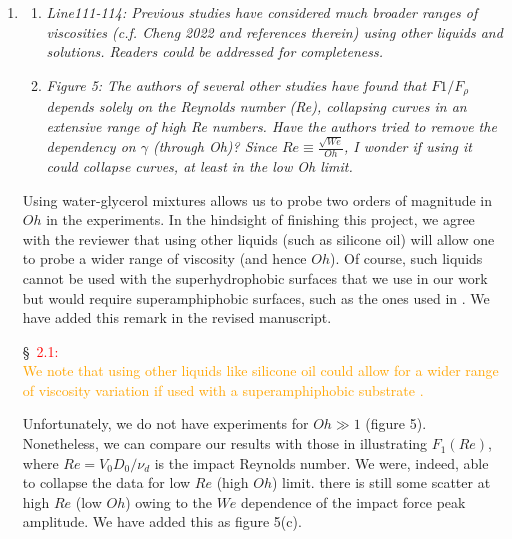\documentclass[]{article}
\newcommand*\red{\textcolor{red}}
\newcommand{\VS}[1]{{\textcolor{orange}{#1}}}
\begin{document}
\begin{enumerate}
	 \item 
	 \begin{enumerate}
	 	 \item \textit{Line111-114: Previous studies have considered much broader ranges of viscosities (c.f. Cheng 2022 and references therein) using other liquids and solutions. Readers could be addressed for completeness.}
	 	\item \textit{Figure 5: The authors of several other studies have found that $F1/F_\rho$ depends solely on the Reynolds number (Re), collapsing curves in an extensive range of high Re numbers. Have the authors tried to remove the dependency on $\gamma$ (through Oh)? Since $Re \equiv \frac{\sqrt{We}}{Oh}$, I wonder if using it could collapse curves, at least in the low Oh limit.}	 	
	 \end{enumerate}
	 	
	Using water-glycerol mixtures allows us to probe two orders of magnitude in $Oh$ in the experiments. In the hindsight of finishing this project, we agree with the reviewer that using other liquids (such as silicone oil) will allow one to probe a wider range of viscosity  (and hence $Oh$). Of course, such liquids cannot be used with the superhydrophobic surfaces that we use in our work but would require superamphiphobic surfaces, such as the ones used in \citet{deng2012candle, ramirez2020lifting}. We have added this remark in the revised manuscript. 
	
	\S~\red{2.1:}\\
	\VS{We note that using other liquids like silicone oil could allow for a wider range of viscosity variation if used with a superamphiphobic substrate \citep{deng2012candle}.}
	
	Unfortunately, we do not have experiments for $Oh \gg 1$ (figure 5). Nonetheless, we can compare our results with those in \citet{Gordillo2018, cheng2021drop} illustrating $F_1(Re)$, where $Re = V_0D_0/\nu_d$ is the impact Reynolds number. We were, indeed, able to collapse the data for low $Re$ (high $Oh$) limit. there is still some scatter at high $Re$ (low $Oh$) owing to the $We$ dependence of the impact force peak amplitude. We have added this as figure 5(c). 
	

\end{enumerate}
\end{document}
